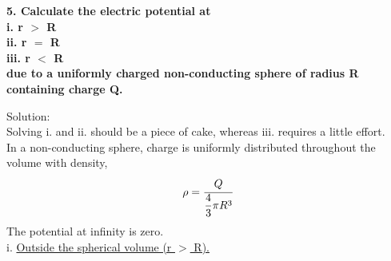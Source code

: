 \begin{tcolorbox}
\textbf{5. Calculate the electric potential at\\
i. r $>$ R\\
ii. r $=$ R\\
iii. r $<$ R\\
due to a uniformly charged non-conducting sphere of radius R containing charge Q.}
\end{tcolorbox}
Solution:\\
Solving i. and ii. should be a piece of cake, whereas iii. requires a little effort.\vspace{2pt}
\\In a non-conducting sphere, charge is uniformly distributed throughout the volume with density, \[\rho = \cfrac{Q}{\dfrac{4}{3}\pi R^3}\]
The potential at infinity is zero.
\vspace{3pt}\\
i. \underline{Outside the spherical volume (r $>$ R).}
\vspace{5pt}

